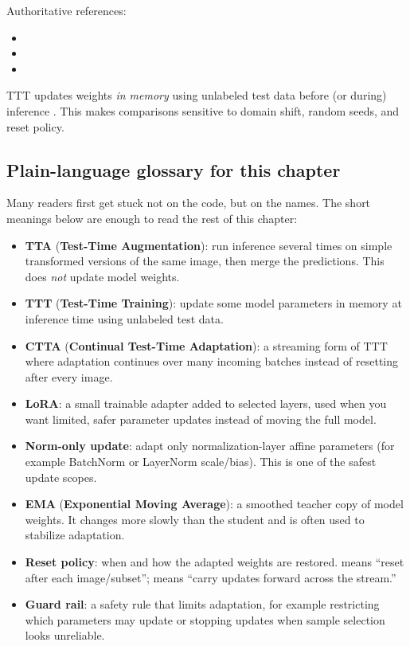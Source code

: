 Authoritative references:
\begin{itemize}
  \item {}
  \item {}
  \item {}
\end{itemize}

TTT updates weights \emph{in memory} using unlabeled test data before (or during) inference \cite{sun2020ttt,wang2021tent}.
This makes comparisons sensitive to domain shift, random seeds, and reset policy.

\subsection{Plain-language glossary for this chapter}
Many readers first get stuck not on the code, but on the names. The short
meanings below are enough to read the rest of this chapter:
\begin{itemize}
  \item \textbf{TTA} (\textbf{Test-Time Augmentation}): run inference several times on simple transformed versions of the same image, then merge the predictions. This does \emph{not} update model weights.
  \item \textbf{TTT} (\textbf{Test-Time Training}): update some model parameters in memory at inference time using unlabeled test data.
  \item \textbf{CTTA} (\textbf{Continual Test-Time Adaptation}): a streaming form of TTT where adaptation continues over many incoming batches instead of resetting after every image.
  \item \textbf{LoRA}: a small trainable adapter added to selected layers, used when you want limited, safer parameter updates instead of moving the full model.
  \item \textbf{Norm-only update}: adapt only normalization-layer affine parameters (for example BatchNorm or LayerNorm scale/bias). This is one of the safest update scopes.
  \item \textbf{EMA} (\textbf{Exponential Moving Average}): a smoothed teacher copy of model weights. It changes more slowly than the student and is often used to stabilize adaptation.
  \item \textbf{Reset policy}: when and how the adapted weights are restored.  means ``reset after each image/subset'';  means ``carry updates forward across the stream.''
  \item \textbf{Guard rail}: a safety rule that limits adaptation, for example restricting which parameters may update or stopping updates when sample selection looks unreliable.
\end{itemize}

